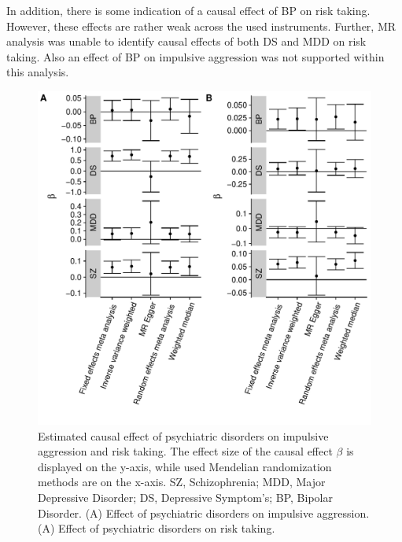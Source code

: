 In addition, there is some indication of a causal effect of BP on risk taking.
However, these effects are rather weak across the used instruments.
Further, MR analysis was unable to identify causal effects of both DS and MDD on risk taking.
Also an effect of BP on impulsive aggression was not supported within this analysis.

\begin{figure}[htpb]
  \centering
  \includegraphics[width=0.9\linewidth]{ukb_psychiatric/figures/overall_mr_effect.pdf}
  \caption[Estimated Causal Effects]{Estimated causal effect of psychiatric disorders on impulsive aggression and risk taking.
    The effect size of the causal effect $\beta$ is displayed on the y-axis, while used Mendelian randomization methods are on the x-axis.
    SZ, Schizophrenia; MDD, Major Depressive Disorder; DS, Depressive Symptom's; BP, Bipolar Disorder.
    (A) Effect of psychiatric disorders on impulsive aggression.
    (A) Effect of psychiatric disorders on risk taking.
  }\label{fig:overall_mr_effect}
\end{figure}

